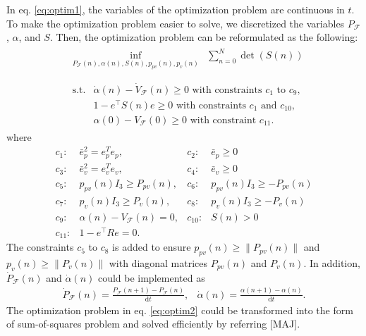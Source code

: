 \documentclass[letterpaper, 10 pt, conference]{ieeeconf}  %
\begin{document}
In eq. \eqref{eq:optim1}, the variables of the optimization problem are continuous in $t$. 
To make the optimization problem easier to solve, 
we discretized the variables $P_\mathcal{F}$, $\alpha$, and $S$. 
Then, the optimization problem can be reformulated as the following:
\begin{align}
&
\begin{array}{rl}
\displaystyle{\inf_{P_\mathcal{F}(n),\alpha(n),S(n),p_{pv}(n),p_v(n)}} & \displaystyle{\sum_{n=0}^{N}} \det(S(n))  \\
\end{array} \label{eq:optim2} \\
&
\begin{array}{rl}
\displaystyle{\text{s.t.}}& \dot{\alpha}(n) - \dot{V}_\mathcal{F}(n) \geq 0\text{ with constraints $c_1$ to $c_9$},  \\
& 1-e^\intercal S(n) e \geq 0\text{ with constraints $c_1$ and $c_{10}$}, \nonumber \\
& \alpha(0) - V_\mathcal{F}(0) \geq 0\text{ with constraint $c_{11}$}. \nonumber
\end{array} \nonumber 
\end{align}
where
\begin{equation}
\begin{array}{rlrl}
c_1:& \bar{e}_p^2 = e_p^Te_p,           & c_2:&\bar{e}_p \geq 0 \\
c_3:& \bar{e}_v^2 = e_v^Te_v,           & c_4:&\bar{e}_v \geq 0 \\
c_5:& p_{pv}(n)I_3 \geq P_{pv}(n),      & c_6:&p_{pv}(n)I_3 \geq -P_{pv}(n) \\
c_7:& p_{ v}(n)I_3 \geq P_{ v}(n),      & c_8:&p_{ v}(n)I_3 \geq -P_{ v}(n) \\
c_9:& \alpha(n) - V_\mathcal{F}(n) = 0, & c_{10}:&S(n) > 0 \\
c_{11}:& 1-e^\intercal R e = 0. &&
\end{array} \nonumber
\end{equation}
The constraints $c_5$ to $c_8$ is added to ensure
 $p_{pv}(n) \geq \|P_{pv}(n)\|$ and $p_v(n) \geq \|P_v(n)\|$ 
with diagonal matrices $P_{pv}(n)$ and $P_v(n)$.
In addition, $\dot{P}_\mathcal{F}(n)$ and $\dot{\alpha}(n)$ could be implemented as
\begin{equation}
\begin{array}{cc}
\dot{P}_\mathcal{F}(n) = \frac{P_\mathcal{F}(n+1) - P_\mathcal{F}(n)}{\text{d}t}, & \dot{\alpha}(n) = \frac{\alpha(n+1)-\alpha(n)}{\text{d}t}. 
\end{array} \nonumber
\end{equation}
The optimization problem in eq. \eqref{eq:optim2} could be transformed into the form of sum-of-squares problem and solved efficiently by referring [MAJ].
\end{document}

